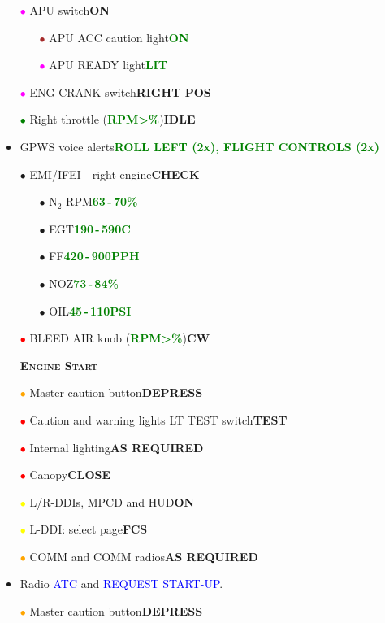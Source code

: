 \documentclass[a4paper,12pt,dvipsnames]{letter}
\newcommand{\radio}[1]{\textcolor{blue}{#1}}
\newcommand{\button}[1]{\textbf{#1}}
\newcommand{\degC}{\textdegree{}C}
\newcommand{\ok}[1]{\textcolor{Green}{\textbf{#1}}}
\newcommand{\myHead}[1]{{\LARGE\textsc{\textbf{#1}}}}
\newcommand{\bi}{\textcolor{ProcessBlue}{$\bullet$\;}}
\newcommand{\ri}{\textcolor{Red}{$\bullet$\;}}
\newcommand{\gi}{\textcolor{Green}{$\bullet$\;}}
\newcommand{\yi}{\textcolor{Yellow}{$\bullet$\;}}
\newcommand{\mi}{\textcolor{Magenta}{$\bullet$\;}}
\newcommand{\oi}{\textcolor{Orange}{$\bullet$\;}}
\renewcommand{\ni}{\textcolor{Brown}{$\bullet$\;}}
\begin{document}
{\begin{itemize}
\begin{itemize}
 \end{itemize}
 \item[\mi] APU switch\dotfill\button{ON}
 \begin{itemize}
  \item[\ni] APU ACC caution light\dotfill\ok{ON}
  \item[\mi] APU READY light\dotfill\ok{LIT}
 \end{itemize}
 \item[\mi] ENG CRANK switch\dotfill\button{RIGHT POS}
 \item[\gi] Right throttle (\ok{RPM\;>\%})\dotfill\button{IDLE}
 \item GPWS voice alerts\dotfill\dotfill\ok{ROLL LEFT (2x), FLIGHT CONTROLS (2x)}
 \item[\bi]EMI/IFEI - right engine\dotfill\button{CHECK}
 \begin{itemize}
  \item[\bi] N$_2$ RPM\dotfill\ok{63\,-\,70\%}
  \item[\bi] EGT\dotfill\ok{190\,-\,590\degC}
  \item[\bi] FF\dotfill\ok{420\,-\,900\;PPH}
  \item[\bi] NOZ\dotfill\ok{73\,-\,84\%}
  \item[\bi] OIL\dotfill\ok{45\,-\,110\;PSI}
 \end{itemize}
 \item[\ri] BLEED AIR knob (\ok{RPM\;>\%})\dotfill\button{CW\textdegree} 
\end{itemize}
\newpage
\begin{itemize}
 \item[] \myHead{Engine Start} 
 \item[\oi] Master caution button\dotfill\button{DEPRESS}
 \item[\ri] Caution and warning lights LT TEST switch\dotfill\button{TEST}
 \item[\ri] Internal lighting\dotfill\button{AS REQUIRED}
 \item[\ri] Canopy\dotfill\button{CLOSE}
 \item[\yi] L/R-DDIs, MPCD and HUD\dotfill\button{ON}
 \item[\yi] L-DDI: select page\dotfill\button{FCS}
 \item[\oi] COMM and COMM radios\dotfill\button{AS REQUIRED}
 \item Radio \radio{ATC} and \radio{REQUEST START-UP}.
 \item[\oi] Master caution button\dotfill\button{DEPRESS}

\end{itemize}}
\end{document}
